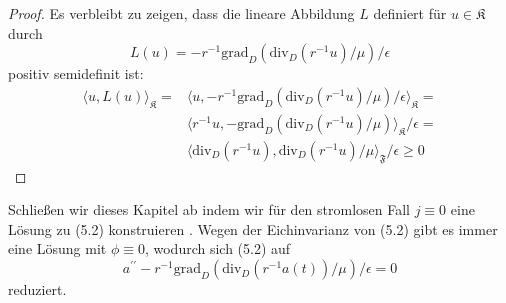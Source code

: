 \documentclass[11pt,a4paper,leqno]{report}
\numberwithin{equation}{chapter}
\begin{document}
\begin{proof}
Es verbleibt zu zeigen, dass die lineare Abbildung $L$ definiert f\"ur $u\in \mathfrak{K}$ durch 
\begin{equation*}
	L(u) = -r^{-1}\text{grad}_D(\text{div}_D(r^{-1}u) / \mu) / \epsilon
\end{equation*}
positiv semidefinit ist:
\begin{align*}
	\langle u, L(u)\rangle_{\mathfrak{K}} = 
	&\langle u, -r^{-1}\text{grad}_D(\text{div}_D(r^{-1}u) / \mu) / \epsilon\rangle_{\mathfrak{K}} =\\ 
	&\langle r^{-1}u, -\text{grad}_D(\text{div}_D(r^{-1}u) / \mu) \rangle_{\mathfrak{K}}/ \epsilon=\\
	&\langle \text{div}_D(r^{-1}u), \text{div}_D(r^{-1}u) / \mu\rangle_{\mathfrak{F}}/ \epsilon\geq 0
\end{align*}
\end{proof}

\iffalse
Schlie\ss{}en wir dieses Kapitel ab indem wir f\"ur den stromlosen Fall $j\equiv0$ eine L\"osung zu (5.2) konstruieren .
Wegen der Eichinvarianz von (5.2) gibt es immer eine L\"osung mit $\phi\equiv0$, wodurch sich (5.2) auf
\begin{equation}
	a^{\prime\prime}-r^{-1}\text{grad}_D(\text{div}_D(r^{-1}a(t)) / \mu) / \epsilon=0
\end{equation}
reduziert.
\end{document}
